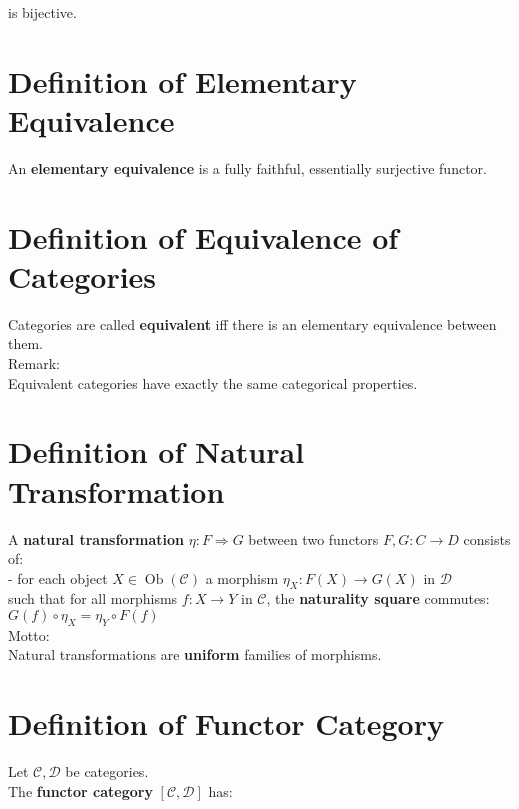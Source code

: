 \documentclass[a4paper, twoside, english, 11pt]{book}
\DeclareMathOperator{\Ob}{Ob}
\newcommand{\C}{\mathcal C}
\newcommand{\D}{\mathcal D}
\begin{document}
\noindent
is bijective.



\section{Definition of Elementary Equivalence}

An \textbf{elementary equivalence} is a fully faithful, essentially surjective functor.



\section{Definition of Equivalence of Categories}

Categories are called \textbf{equivalent} iff there is an elementary equivalence between them. \\

\noindent
Remark: \\
Equivalent categories have exactly the same categorical properties.



\section{Definition of Natural Transformation}

A \textbf{natural transformation} $\eta : F \Rightarrow G$ between two functors $F, G : C \rightarrow D$ consists of: \\

- for each object $X \in \Ob(\C)$ a morphism $\eta_X : F(X) \rightarrow G(X)$ in $\D$ \\

\noindent
such that for all morphisms $f : X \rightarrow Y$ in $\C$, the \textbf{naturality square} commutes: \\

$G(f) \circ \eta_X = \eta_Y \circ F(f)$ \\

\noindent
Motto: \\
Natural transformations are \textbf{uniform} families of morphisms.



\section{Definition of Functor Category}

Let $\C, \D$ be categories. \\
The \textbf{functor category} $[\C, \D]$ has: \\
\end{document}
